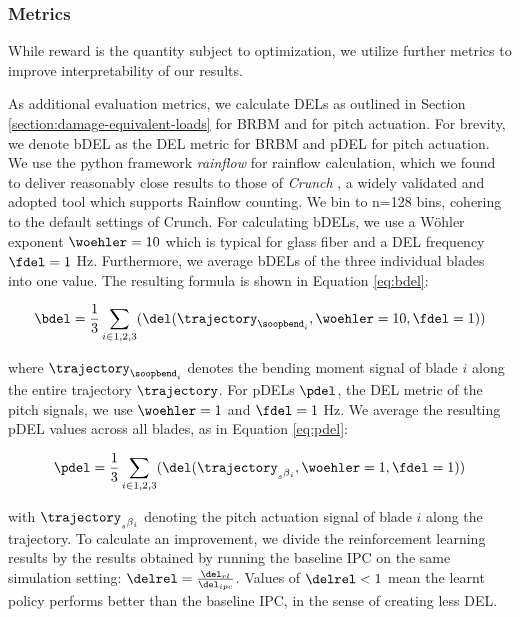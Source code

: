 \subsubsection{Metrics}

While reward is the quantity subject to optimization, we utilize further metrics to improve interpretability of our results.

As additional evaluation metrics, we calculate \acp{DEL} as outlined in Section \ref{section:damage-equivalent-loads} for \ac{BRBM} and for pitch actuation. For brevity, we denote \ac{bDEL} as the \ac{DEL} metric for \ac{BRBM} and \ac{pDEL} for pitch actuation. We use the python framework \textit{rainflow} for rainflow calculation, which we found to deliver reasonably close results to those of \textit{Crunch} \cite{buhlCRUNCHUSERGUIDE2001}, a widely validated and adopted tool which supports Rainflow counting. We bin to n=128 bins, cohering to the default settings of Crunch. For calculating \acp{bDEL}, we use a Wöhler exponent $\woehler = 10$ which is typical for glass fiber and a \ac{DEL} frequency $\fdel = 1$ Hz. Furthermore, we average \acp{bDEL} of the three individual blades into one value. The resulting formula is shown in Equation \ref{eq:bdel}:

\begin{equation}
  \bdel = \frac{1}{3} \sum_{i \in {1,2,3}}(\del(\trajectory_{\soopbend_i}, \woehler=10, \fdel=1))
  \label{eq:bdel}
\end{equation}

where $\trajectory_{\soopbend_i}$ denotes the bending moment signal of blade $i$ along the entire trajectory $\trajectory$. For \acp{pDEL} $\pdel$, the DEL metric of the pitch signals, we use $\woehler = 1$ and $\fdel = 1$ Hz. We average the resulting \ac{pDEL} values across all blades, as in Equation \ref{eq:pdel}:

\begin{equation}
  \pdel = \frac{1}{3} \sum_{i \in {1,2,3}}(\del(\trajectory_{\spitchx_i}, \woehler=1, \fdel=1))
  \label{eq:pdel}
\end{equation}

with $\trajectory_{\spitchx_i}$ denoting the pitch actuation signal of blade $i$ along the trajectory. To calculate an improvement, we divide the reinforcement learning results by the results obtained by running the baseline \ac{IPC} on the same simulation setting: $\delrel = \frac{\del_{rl}}{\del_{ipc}}$. Values of $\delrel<1$ mean the learnt policy performs better than the baseline \ac{IPC}, in the sense of creating less \ac{DEL}. 

